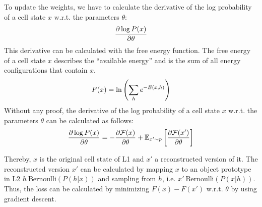 To update the weights, we have to calculate the derivative of the log probability of a cell state $x$ w.r.t. the parameters $\theta$:
\begin{align}\eqlbl{l2_energy7}
	\frac{\partial \log P(x)}{\partial \theta }
\end{align}
This derivative can be calculated with the free energy function. The free energy of a cell state $x$ describes the ``available energy'' and is the sum of all energy configurations that contain $x$.
\begin{align}\eqlbl{l2_energy8}
	F(x) = \ln \left( \sum_h e^{-E(x,h)} \right)
\end{align}
Without any proof, the derivative of the log probability of a cell state $x$ w.r.t. the parameters $\theta$ can be calculated as follows:
\begin{align}\eqlbl{l2_energy9}
	\frac{\partial \log P(x)}{\partial \theta } = - \frac{\partial \mathcal{F}(x)}{\partial \theta} + \mathbb{E}_{x' \sim p} \left[ \frac{\partial \mathcal{F}(x')}{\partial \theta}  \right]
\end{align}

Thereby, $x$ is the original cell state of L1 and $x'$ a reconstructed version of it.
The reconstructed version $x'$ can be calculated by mapping $x$ to an object prototype in L2  $h ~ \text{Bernoulli}(P(h | x) )$ and sampling from $h$, i.e. $x' ~ \text{Bernoulli}(P(x | h))$.
Thus, the loss can be calculated by minimizing $F(x) - F(x')$ w.r.t. $\theta$ by using gradient descent.





